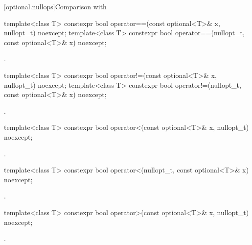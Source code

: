 [optional.nullops]{Comparison with }

%
\begin{itemdecl}
template<class T> constexpr bool operator==(const optional<T>& x, nullopt_t) noexcept;
template<class T> constexpr bool operator==(nullopt_t, const optional<T>& x) noexcept;
\end{itemdecl}

\begin{itemdescr}
\pnum
\returns
{}.
\end{itemdescr}

%
\begin{itemdecl}
template<class T> constexpr bool operator!=(const optional<T>& x, nullopt_t) noexcept;
template<class T> constexpr bool operator!=(nullopt_t, const optional<T>& x) noexcept;
\end{itemdecl}

\begin{itemdescr}
\pnum
\returns
{}.
\end{itemdescr}

%
\begin{itemdecl}
template<class T> constexpr bool operator<(const optional<T>& x, nullopt_t) noexcept;
\end{itemdecl}

\begin{itemdescr}
\pnum
\returns
{}.
\end{itemdescr}

%
\begin{itemdecl}
template<class T> constexpr bool operator<(nullopt_t, const optional<T>& x) noexcept;
\end{itemdecl}

\begin{itemdescr}
\pnum
\returns
{}.
\end{itemdescr}

%
\begin{itemdecl}
template<class T> constexpr bool operator>(const optional<T>& x, nullopt_t) noexcept;
\end{itemdecl}

\begin{itemdescr}
\pnum
\returns
{}.
\end{itemdescr}


